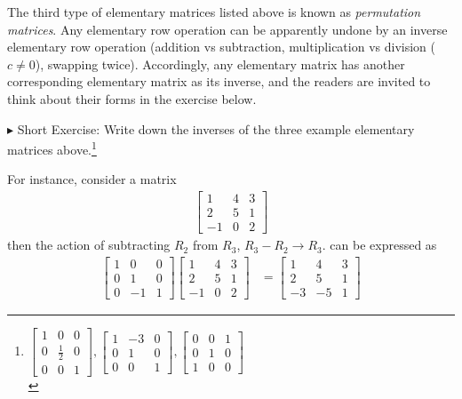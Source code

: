 The third type of elementary matrices listed above is known as \textit{permutation matrices}. Any elementary row operation can be apparently undone by an inverse elementary row operation (addition vs subtraction, multiplication vs division ($c \neq 0$), swapping twice). Accordingly, any elementary matrix has another corresponding elementary matrix as its inverse, and the readers are invited to think about their forms in the exercise below. \par
$\blacktriangleright$ Short Exercise: Write down the inverses of the three example elementary matrices above.\footnote{$
\begin{bmatrix}
1 & 0 & 0 \\
0 & \frac{1}{2} & 0 \\
0 & 0 & 1
\end{bmatrix},
\begin{bmatrix}
1 & -3 & 0 \\
0 & 1 & 0 \\
0 & 0 & 1
\end{bmatrix},
\begin{bmatrix}
0 & 0 & 1 \\
0 & 1 & 0 \\
1 & 0 & 0
\end{bmatrix}
$\\}\par
For instance, consider a matrix
\begin{align*}
\begin{bmatrix}
1 & 4 & 3 \\
2 & 5 & 1 \\
-1 & 0 & 2
\end{bmatrix}     
\end{align*}
then the action of subtracting $R_2$ from $R_3$, $R_3 - R_2 \to R_3$. can be expressed as
\begin{align*}
\begin{bmatrix}
1 & 0 & 0 \\
0 & 1 & 0 \\
0 & -1 & 1
\end{bmatrix} 
\begin{bmatrix}
1 & 4 & 3 \\
2 & 5 & 1 \\
-1 & 0 & 2
\end{bmatrix} 
&= 
\begin{bmatrix}
1 & 4 & 3 \\
2 & 5 & 1 \\
-3 & -5 & 1
\end{bmatrix} 
\end{align*}
